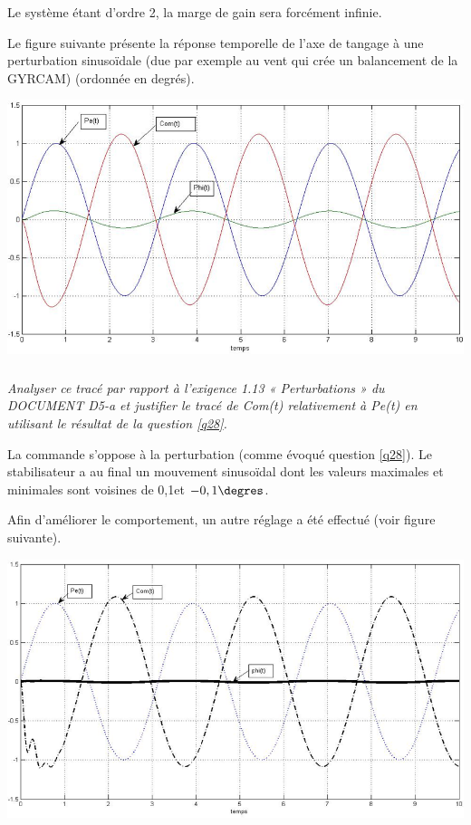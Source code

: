 \documentclass[10pt,fleqn]{article} %
\begin{document}
\begin{multicols}{2}
\begin{corrige}
Le système étant d'ordre 2, la marge de gain sera forcément infinie.
\end{corrige}
\else
\fi

Le figure suivante présente la réponse temporelle de l’axe de tangage à une perturbation sinusoïdale (due par
exemple au vent qui crée un balancement de la GYRCAM) (ordonnée en degrés).


\begin{center}
\includegraphics[width=\linewidth]{images/fig_05}
\end{center}

\subparagraph{}
\textit{Analyser ce tracé par rapport à l’exigence 1.13 « Perturbations » du DOCUMENT D5-a et justifier le
tracé de Com(t) relativement à Pe(t) en utilisant le résultat de la question \ref{q28}.}
\ifprof
\begin{corrige}
La commande s'oppose à la perturbation (comme évoqué question \ref{q28}). Le stabilisateur a au final un mouvement sinusoïdal dont les valeurs maximales et minimales sont voisines de 0,1\degres et $-0,1\degres$. 
\end{corrige}
\else
\fi

Afin d’améliorer le comportement, un autre réglage a été effectué (voir figure suivante).

\begin{center}
\includegraphics[width=\linewidth]{images/fig_06}
\end{center}



\end{multicols}
\end{document}
